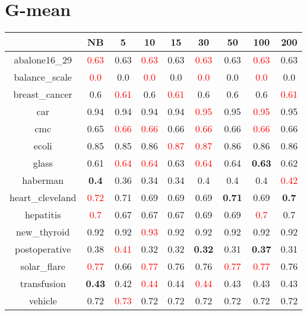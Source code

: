 \documentclass{article}%
\begin{document}
\section*{G{-}mean}%
\begin{tabular}{c|cccccccc}%
\hline%
&NB&5&10&15&30&50&100&200\\%
\hline%
abalone16\_29&\textcolor{red}{ 
0.63
}&0.63&\textcolor{red}{ 
0.63
}&0.63&\textcolor{red}{ 
0.63
}&0.63&\textcolor{red}{ 
0.63
}&0.63\\%
\hline%
balance\_scale&\textcolor{red}{ 
0.0
}&0.0&\textcolor{red}{ 
0.0
}&0.0&\textcolor{red}{ 
0.0
}&0.0&\textcolor{red}{ 
0.0
}&0.0\\%
\hline%
breast\_cancer&0.6&\textcolor{red}{ 
0.61
}&0.6&\textcolor{red}{ 
0.61
}&0.6&0.6&0.6&\textcolor{red}{ 
0.61
}\\%
\hline%
car&0.94&0.94&0.94&0.94&\textcolor{red}{ 
0.95
}&0.95&\textcolor{red}{ 
0.95
}&0.95\\%
\hline%
cmc&0.65&\textcolor{red}{ 
0.66
}&\textcolor{red}{ 
0.66
}&0.66&\textcolor{red}{ 
0.66
}&0.66&\textcolor{red}{ 
0.66
}&0.66\\%
\hline%
ecoli&0.85&0.85&0.86&\textcolor{red}{ 
0.87
}&\textcolor{red}{ 
0.87
}&0.86&0.86&0.86\\%
\hline%
glass&0.61&\textcolor{red}{ 
0.64
}&\textcolor{red}{ 
0.64
}&0.63&\textcolor{red}{ 
0.64
}&0.64&\textbf{0.63}&0.62\\%
\hline%
haberman&\textbf{0.4}&0.36&0.34&0.34&0.4&0.4&0.4&\textcolor{red}{ 
0.42
}\\%
\hline%
heart\_cleveland&\textcolor{red}{ 
0.72
}&0.71&0.69&0.69&0.69&\textbf{0.71}&0.69&\textbf{0.7}\\%
\hline%
hepatitis&\textcolor{red}{ 
0.7
}&0.67&0.67&0.67&0.69&0.69&\textcolor{red}{ 
0.7
}&0.7\\%
\hline%
new\_thyroid&0.92&0.92&\textcolor{red}{ 
0.93
}&0.92&0.92&0.92&0.92&0.92\\%
\hline%
postoperative&0.38&\textcolor{red}{ 
0.41
}&0.32&0.32&\textbf{0.32}&0.31&\textbf{0.37}&0.31\\%
\hline%
solar\_flare&\textcolor{red}{ 
0.77
}&0.66&\textcolor{red}{ 
0.77
}&0.76&0.76&\textcolor{red}{ 
0.77
}&\textcolor{red}{ 
0.77
}&0.76\\%
\hline%
transfusion&\textbf{0.43}&0.42&\textcolor{red}{ 
0.44
}&0.44&\textcolor{red}{ 
0.44
}&0.43&0.43&0.43\\%
\hline%
vehicle&0.72&\textcolor{red}{ 
0.73
}&0.72&0.72&0.72&0.72&0.72&0.72\\%
\hline%

\end{tabular}
\end{document}
